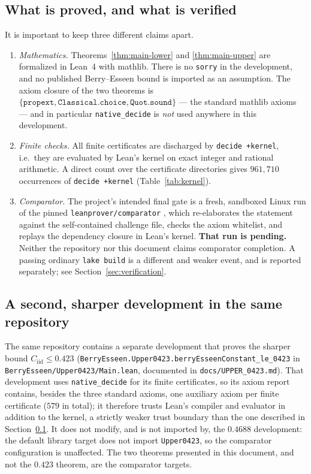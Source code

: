 \documentclass[10pt,a4paper]{article}
\theoremstyle{plain}
\theoremstyle{definition}
\newcommand{\Cii}{C_{\mathrm{iid}}}
\newcommand{\lean}[1]{\texttt{#1}}
\newcommand{\file}[1]{\texttt{#1}}
\begin{document}
\subsection{What is proved, and what is verified}
\label{sec:intro-status}

It is important to keep three different claims apart.

\begin{enumerate}[leftmargin=2.2em]
\item \emph{Mathematics.} Theorems~\ref{thm:main-lower} and
  \ref{thm:main-upper} are formalized in Lean~4 with mathlib. There is no
  \lean{sorry} in the development, and no published Berry--Esseen bound is
  imported as an assumption. The axiom closure of the two theorems is
  $\{\lean{propext},\lean{Classical.choice},\lean{Quot.sound}\}$ --- the
  standard mathlib axioms --- and in particular \lean{native\_decide} is
  \emph{not} used anywhere in this development.
\item \emph{Finite checks.} All finite certificates are discharged by
  \lean{decide +kernel}, i.e.\ they are evaluated by Lean's kernel on exact
  integer and rational arithmetic. A direct count over the certificate
  directories gives $961{,}710$ occurrences of \lean{decide +kernel}
  (Table~\ref{tab:kernel}).
\item \emph{Comparator.} The project's intended final gate is a fresh,
  sandboxed Linux run of the pinned \file{leanprover/comparator}
  \cite{Comparator2026}, which re-elaborates the statement against the
  self-contained challenge file, checks the axiom whitelist, and replays the
  dependency closure in Lean's kernel. \textbf{That run is pending.} Neither
  the repository nor this document claims comparator completion. A passing
  ordinary \lean{lake build} is a different and weaker event, and is reported
  separately; see Section~\ref{sec:verification}.
\end{enumerate}

\subsection{A second, sharper development in the same repository}
\label{sec:0423-note}

The same repository contains a separate development that proves the sharper
bound $\Cii\le0.423$ (\lean{BerryEsseen.Upper0423.berryEsseenConstant\_le\_0423}
in \file{BerryEsseen/Upper0423/Main.lean}, documented in
\file{docs/UPPER\_0423.md}). That development uses \lean{native\_decide} for its
finite certificates, so its axiom report contains, besides the three standard
axioms, one auxiliary axiom per finite certificate ($579$ in total); it
therefore trusts Lean's compiler and evaluator in addition to the kernel, a
strictly weaker trust boundary than the one described in
Section~\ref{sec:intro-status}. It does not modify, and is not imported by,
the $0.4688$ development: the default library target does not import
\file{Upper0423}, so the comparator configuration is unaffected. The two
theorems presented in this document, and not the $0.423$ theorem, are the
comparator targets.
\end{document}
